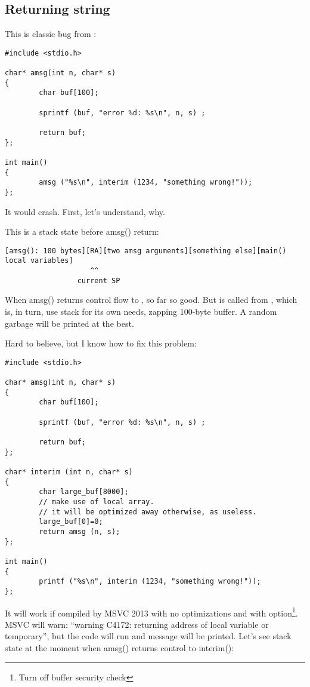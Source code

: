 \subsection{Returning string}

This is classic bug from \RobPikePractice{}:

\begin{lstlisting}[style=customc]
#include <stdio.h>

char* amsg(int n, char* s)
{
        char buf[100];

        sprintf (buf, "error %d: %s\n", n, s) ;

        return buf;
};

int main()
{
        amsg ("%s\n", interim (1234, "something wrong!"));
};
\end{lstlisting}

It would crash.
First, let's understand, why.

This is a stack state before amsg() return:

\begin{lstlisting}
[amsg(): 100 bytes][RA][two amsg arguments][something else][main() local variables]
                    ^^
                 current SP
\end{lstlisting}

When amsg() returns control flow to \main, so far so good.
But \printf is called from \main, which is, in turn, use stack for its own needs, zapping 100-byte buffer.
A random garbage will be printed at the best.

Hard to believe, but I know how to fix this problem:

\begin{lstlisting}[style=customc]
#include <stdio.h>

char* amsg(int n, char* s)
{
        char buf[100];

        sprintf (buf, "error %d: %s\n", n, s) ;

        return buf;
};

char* interim (int n, char* s)
{
        char large_buf[8000];
        // make use of local array.
        // it will be optimized away otherwise, as useless.
        large_buf[0]=0;
        return amsg (n, s);
};

int main()
{
        printf ("%s\n", interim (1234, "something wrong!"));
};
\end{lstlisting}

It will work if compiled by MSVC 2013 with no optimizations and with  option\footnote{Turn off buffer security check}.
MSVC will warn: ``warning C4172: returning address of local variable or temporary'', but the code will run and message
will be printed.
Let's see stack state at the moment when amsg() returns control to interim():

